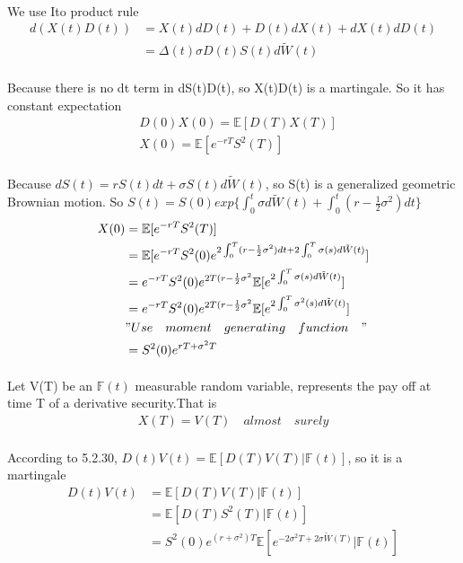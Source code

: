 \documentclass{article}
\begin{document}
\paragraph{}{We use Ito product rule }
\begin{align*}
  d(X(t)D(t)) &= X(t)dD(t)+D(t)dX(t)+dX(t)dD(t) \\
  &=\Delta (t)\sigma D(t)S(t)d\tilde{W}(t)
\end{align*}
\paragraph{}{Because there is no dt term in dS(t)D(t), so X(t)D(t) is a martingale. So it has constant expectation}
\begin{align*}
  &D(0)X(0)  =\mathbb{E}[D(T)X(T)] \\
  &X(0)=\mathbb{E}[e^{-rT}S^2(T)]
\end{align*}
\paragraph{}{Because $dS(t)=rS(t)dt+\sigma S(t)d\tilde{W}(t)$, so S(t) is a generalized geometric Brownian motion. So $S(t)=S(0)exp\{\int_{0}^{t}\sigma d\tilde{W}(t)+\int_{0}^{t}(r-\frac{1}{2}\sigma^2)dt\}$}
\begin{align*}
  X(0) &=\mathbb{E}[e^{-rT}S^2(T)] \\
  & =\mathbb{E}[e^{-rT}S^2(0)e^{2\int_{0}^{T}(r-\frac{1}{2}\sigma^2)dt+2\int_{0}^{T}\sigma(s)d\tilde{W}(t)}] \\
 & =e^{-rT}S^2(0)e^{2T(r-\frac{1}{2}\sigma^2}\mathbb{E}[e^{2\int_{0}^{T}\sigma(s)d\tilde{W}(t)}]\\
&= e^{-rT}S^2(0)e^{2T(r-\frac{1}{2}\sigma^2}\mathbb{E}[e^{2\int_{0}^{T}\sigma^2(s)d\tilde{W}(t)}]\\
 &"Use\quad moment\quad generating\quad function\quad"\\
 &=S^2(0)e^{rT+\sigma^2T}
\end{align*}
\paragraph{}{Let V(T) be an $\mathbb{F}(t)$ measurable random variable, represents the pay off at time T of a derivative security.That is \\}
\begin{align*}
  X(T)=V(T)\quad almost \quad surely
\end{align*}
\paragraph{}{According to 5.2.30, $D(t)V(t)=\mathbb{E}[D(T)V(T)|\mathbb{F}(t)]$, so it is a martingale}
\begin{align*}
  D(t)V(t) & =\mathbb{E}[D(T)V(T)|\mathbb{F}(t)] \\
  & =\mathbb{E}[D(T)S^2(T)|\mathbb{F}(t)]\\
  & =S^2(0)e^{(r+\sigma^2)T}\mathbb{E}[e^{-2\sigma^2T+2\sigma \tilde{W}(T)}|\mathbb{F}(t)]\\
\end{align*}
\end{document}
